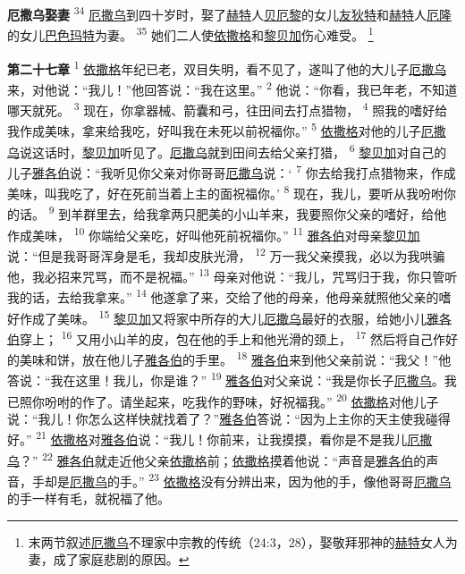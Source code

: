 \textbf{厄撒乌娶妻\quad}
\textsuperscript{34}
\uline{厄撒乌}到四十岁时，娶了\uline{赫特}人\uline{贝厄黎}的女儿\uline{友狄特}和\uline{赫特}人\uline{厄隆}的女儿\uline{巴色玛特}为妻。
\textsuperscript{35}
她们二人使\uline{依撒格}和\uline{黎贝加}伤心难受。
\footnote{末两节叙述\uline{厄撒乌}不理家中宗教的传统（24:3，28），娶敬拜邪神的\uline{赫特}女人为妻，成了家庭悲剧的原因。}

\textbf{第二十七章\quad}
\textsuperscript{1}
\uline{依撒格}年纪已老，双目失明，看不见了，遂叫了他的大儿子\uline{厄撒乌}来，对他说：“我儿！”他回答说：“我在这里。”
\textsuperscript{2}
他说：“你看，我已年老，不知道哪天就死。
\textsuperscript{3}
现在，你拿器械、箭囊和弓，往田间去打点猎物，
\textsuperscript{4}
照我的嗜好给我作成美味，拿来给我吃，好叫我在未死以前祝福你。”
\textsuperscript{5}
\uline{依撒格}对他的儿子\uline{厄撒乌}说这话时，\uline{黎贝加}听见了。\uline{厄撒乌}就到田间去给父亲打猎，
\textsuperscript{6}
\uline{黎贝加}对自己的儿子\uline{雅各伯}说：“我听见你父亲对你哥哥\uline{厄撒乌}说：‘
\textsuperscript{7}
你去给我打点猎物来，作成美味，叫我吃了，好在死前当着上主的面祝福你。’
\textsuperscript{8}
现在，我儿，要听从我吩咐你的话。
\textsuperscript{9}
到羊群里去，给我拿两只肥美的小山羊来，我要照你父亲的嗜好，给他作成美味，
\textsuperscript{10}
你端给父亲吃，好叫他死前祝福你。”
\textsuperscript{11}
\uline{雅各伯}对母亲\uline{黎贝加}说：“但是我哥哥浑身是毛，我却皮肤光滑，
\textsuperscript{12}
万一我父亲摸我，必以为我哄骗他，我必招来咒骂，而不是祝福。”
\textsuperscript{13}
母亲对他说：“我儿，咒骂归于我，你只管听我的话，去给我拿来。”
\textsuperscript{14}
他遂拿了来，交给了他的母亲，他母亲就照他父亲的嗜好作成了美味。
\textsuperscript{15}
\uline{黎贝加}又将家中所存的大儿\uline{厄撒乌}最好的衣服，给她小儿\uline{雅各伯}穿上；
\textsuperscript{16}
又用小山羊的皮，包在他的手上和他光滑的颈上，
\textsuperscript{17}
然后将自己作好的美味和饼，放在他儿子\uline{雅各伯}的手里。
\textsuperscript{18}
\uline{雅各伯}来到他父亲前说：“我父！”他答说：“我在这里！我儿，你是谁？”
\textsuperscript{19}
\uline{雅各伯}对父亲说：“我是你长子\uline{厄撒乌}。我已照你吩咐的作了。请坐起来，吃我作的野味，好祝福我。”
\textsuperscript{20}
\uline{依撒格}对他儿子说：“我儿！你怎么这样快就找着了？”\uline{雅各伯}答说：“因为上主你的天主使我碰得好。”
\textsuperscript{21}
\uline{依撒格}对\uline{雅各伯}说：“我儿！你前来，让我摸摸，看你是不是我儿\uline{厄撒乌}？”
\textsuperscript{22}
\uline{雅各伯}就走近他父亲\uline{依撒格}前；\uline{依撒格}摸着他说：“声音是\uline{雅各伯}的声音，手却是\uline{厄撒乌}的手。”
\textsuperscript{23}
\uline{依撒格}没有分辨出来，因为他的手，像他哥哥\uline{厄撒乌}的手一样有毛，就祝福了他。
